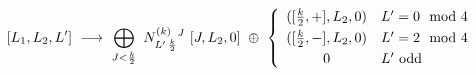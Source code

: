 \begin{equation}\label{mmDAflowV}
\hspace*{-2cm}[L_{1},L_{2},L']\  \longrightarrow \ \makebox[10cm][l]{$
\displaystyle \bigoplus_{J< \frac{k}{2}}\ 
N^{(k)}_{L'\,\frac{k}{2}}{}^{J}\ [J,L_{2},0]\ \oplus \
\left\{ 
\begin{array}{cl}
([ \frac{k}{2} , + ],L_{2},0) & L'=0 \mod 4 \\[1mm]
{( [ \frac{k}{2} , - ],L_{2},0)} & L'=2 \mod 4 \\[1mm] 
0 & L' \mbox{ odd}
\end{array} 
\right. 
$ }
\end{equation}

